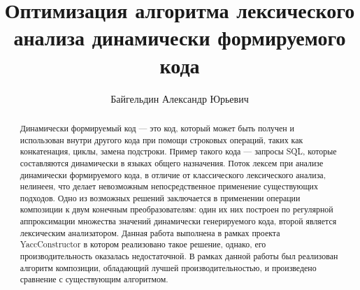 \title{Оптимизация алгоритма лексического анализа динамически формируемого кода}


\author{Байгельдин Александр Юрьевич}



\maketitle             

\begin{abstract}
Динамически формируемый код --- это код, который может быть получен и использован внутри другого кода при помощи строковых операций, таких как конкатенация, циклы, замена подстроки. Пример такого кода --- запросы SQL, которые составляются динамически в языках общего назначения. Поток лексем при анализе динамически формируемого кода, в отличие от классического лексического анализа, нелинеен, что делает невозможным непосредственное применение существующих подходов. Одно из возможных решений заключается в применении операции композиции к двум конечным преобразователям: один их них построен по регулярной аппроксимации множества значений динамически генерируемого кода, второй является лексическим анализатором. Данная работа выполнена в рамках проекта YaccConstructor в котором реализовано такое решение, однако, его производительность оказалась недостаточной. В рамках данной работы был реализован алгоритм композиции, обладающий лучшей производительностью, и произведено сравнение с существующим алгоритмом.
\end{abstract}







